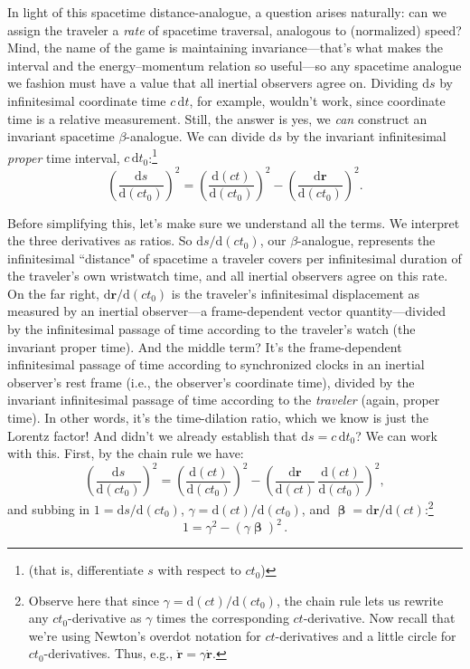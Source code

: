 \documentclass[12pt]{article}
\renewcommand{\vv}[1]{\mathbf{#1}}
\newcommand{\dd}[1]{\mathrm{d}#1}
\newcommand{\vvbeta}{\bm{\upbeta}}
\begin{document}
In light of this spacetime distance-analogue, a question arises naturally: can we assign the traveler a \emph{rate} of spacetime traversal, analogous to (normalized) speed? Mind, the name of the game is maintaining invariance---that's what makes the interval and the energy--momentum relation so useful---so any spacetime analogue we fashion must have a value that all inertial observers agree on. Dividing $\dd s$ by infinitesimal coordinate time $c \, \dd t$, for example, wouldn't work, since coordinate time is a relative measurement. Still, the answer is yes, we \emph{can} construct an invariant spacetime $\beta$-analogue. We can divide $\dd s$ by the invariant infinitesimal \emph{proper} time interval, $c \, \dd t_0$:\footnote{(that is, differentiate $s$ with respect to $ct_0$)}
\begin{equation*}
\left(\dfrac{\dd s}{\dd (ct_0)} \right)^2 = \left(\dfrac{\dd (ct)}{\dd (c t_0)} \right)^2 - \left(\dfrac{\dd \vv r}{\dd (c t_0)} \right)^2.
\end{equation*}

Before simplifying this, let's make sure we understand all the terms. We interpret the three derivatives as ratios. So $\dd s/\dd (c t_0)$, our $\beta$-analogue, represents the infinitesimal ``distance" of spacetime a traveler covers per infinitesimal duration of the traveler's own wristwatch time, and all inertial observers agree on this rate. On the far right, $\dd \vv r/\dd (c t_0)$ is the traveler's infinitesimal displacement as measured by an inertial observer---a frame-dependent vector quantity---divided by the infinitesimal passage of time according to the traveler's watch (the invariant proper time). And the middle term? It's the frame-dependent infinitesimal passage of time according to synchronized clocks in an inertial observer's rest frame (i.e., the observer's coordinate time), divided by the invariant infinitesimal passage of time according to the \emph{traveler} (again, proper time). In other words, it's the time-dilation ratio, which we know is just the Lorentz factor! And didn't we already establish that $\dd s = c \, \dd t_0$? We can work with this. First, by the chain rule we have:
\begin{equation*}
\left(\dfrac{\dd s}{\dd (c t_0)} \right)^2 = \left(\dfrac{\dd (ct)}{\dd (c t_0)} \right)^2 - \left( \dfrac{\dd \vv r}{\dd (ct)} \, \dfrac{\dd (ct)}{\dd (c t_0)} \right)^2,
\end{equation*}
and subbing in $1 = \dd s / \dd (c t_0)$, $\gamma = \dd (ct) / \dd (c t_0)$, and $\vvbeta = \dd \vv r / \dd (ct)$:\footnote{\label{fn:cr}Observe here that since $\gamma = \dd (ct) / \dd (c t_0)$, the chain rule lets us rewrite any $c t_0$-derivative as $\gamma$ times the corresponding $ct$-derivative. Now recall that we're using Newton's overdot notation for $ct$-derivatives and a little circle for $c t_0$-derivatives. Thus, e.g., $\mathring{\vv r} = \gamma \dot{\vv r}$.}
\begin{equation}\label{eq:25}
\boxed{1 = \gamma^2 - \left(\gamma \vvbeta \right)^2} \, .
\end{equation}
\end{document}
